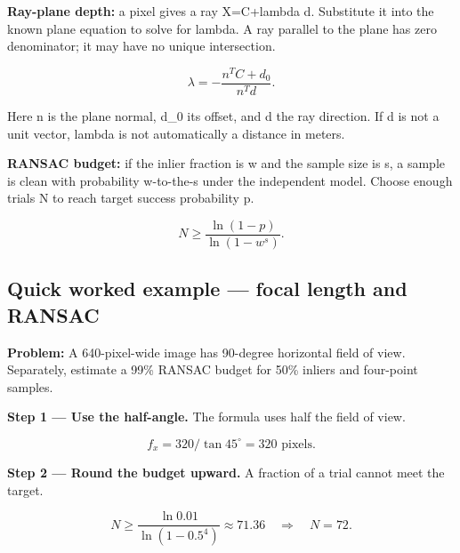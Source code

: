 \documentclass[11pt,letterpaper]{article}
\begin{document}
\textbf{Ray-plane depth:} a pixel gives a ray X=C+lambda d. Substitute it into the known plane equation to solve for lambda. A ray parallel to the plane has zero denominator; it may have no unique intersection.



\begin{tcolorbox}\color{MathBlue}\[\lambda=-\frac{n^TC+d_0}{n^Td}.\]\end{tcolorbox}


Here n is the plane normal, d\_0 its offset, and d the ray direction. If d is not a unit vector, lambda is not automatically a distance in meters.



\textbf{RANSAC budget:} if the inlier fraction is w and the sample size is s, a sample is clean with probability w-to-the-s under the independent model. Choose enough trials N to reach target success probability p.



\begin{tcolorbox}\color{MathBlue}\[N\ge\frac{\ln(1-p)}{\ln(1-w^s)}.\]\end{tcolorbox}


\subsection*{Quick worked example — focal length and RANSAC}


\textbf{Problem:} A 640-pixel-wide image has 90-degree horizontal field of view. Separately, estimate a 99\% RANSAC budget for 50\% inliers and four-point samples.



\textcolor{StepRed}{\textbf{Step 1 — Use the half-angle.} The formula uses half the field of view.}



\begin{tcolorbox}\color{MathBlue}\[f_x=320/\tan45^\circ=320\text{ pixels}.\]\end{tcolorbox}


\textcolor{StepRed}{\textbf{Step 2 — Round the budget upward.} A fraction of a trial cannot meet the target.}



\begin{tcolorbox}\color{MathBlue}\[N\ge\frac{\ln0.01}{\ln(1-0.5^4)}\approx71.36 \quad\Rightarrow\quad N=72.\]\end{tcolorbox}
\end{document}
